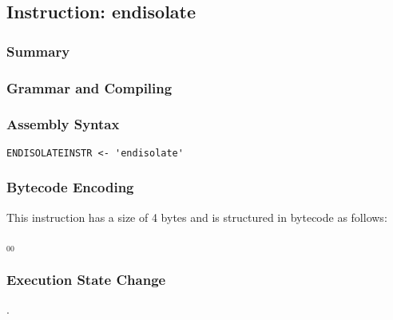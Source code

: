 \subsection{Instruction: endisolate}

\subsubsection{Summary}


\subsubsection{Grammar and Compiling}


\subsubsection{Assembly Syntax}

\begin{myquote}
\begin{verbatim}
ENDISOLATEINSTR <- 'endisolate'
\end{verbatim}
\end{myquote}


\subsubsection{Bytecode Encoding}

This instruction has a size of 4 bytes and is structured in bytecode as follows:

$_{00}$\ 


\subsubsection{Execution State Change}

.


